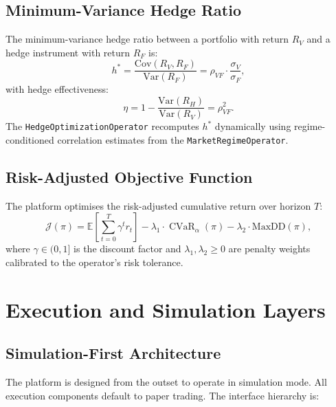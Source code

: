 \documentclass[12pt,openany]{book}
\numberwithin{equation}{chapter}
\theoremstyle{plain}
\theoremstyle{definition}
\theoremstyle{remark}
\DeclareMathOperator{\CVaR}{CVaR}
\begin{document}
\section{Minimum-Variance Hedge Ratio}

The minimum-variance hedge ratio between a portfolio with return $R_V$
and a hedge instrument with return $R_F$ is:
\begin{equation}
    h^* = \frac{\mathrm{Cov}(R_V, R_F)}{\mathrm{Var}(R_F)}
        = \rho_{VF} \cdot \frac{\sigma_V}{\sigma_F},
    \label{eq:hedge_ratio}
\end{equation}
with hedge effectiveness:
\begin{equation}
    \eta = 1 - \frac{\mathrm{Var}(R_H)}{\mathrm{Var}(R_V)} = \rho_{VF}^2.
\end{equation}
The \texttt{HedgeOptimizationOperator} recomputes $h^*$ dynamically
using regime-conditioned correlation estimates from the
\texttt{MarketRegimeOperator}.

\section{Risk-Adjusted Objective Function}

The platform optimises the risk-adjusted cumulative return over
horizon $T$:
\begin{equation}
    \mathcal{J}(\pi) = \mathbb{E}\!\left[\sum_{t=0}^T \gamma^t r_t\right]
    - \lambda_1 \cdot \CVaR_\alpha(\pi)
    - \lambda_2 \cdot \text{MaxDD}(\pi),
    \label{eq:objective}
\end{equation}
where $\gamma \in (0, 1]$ is the discount factor and $\lambda_1, \lambda_2 \geq 0$
are penalty weights calibrated to the operator's risk tolerance.

\chapter{Execution and Simulation Layers}

\section{Simulation-First Architecture}

The platform is designed from the outset to operate in simulation mode.
All execution components default to paper trading. The interface hierarchy
is:
\end{document}
